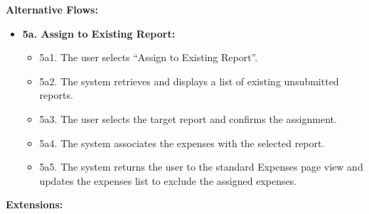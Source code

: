 \vspace{0.3cm}

\textbf{Alternative Flows:}

\begin{itemize} [label={}, leftmargin=0.75cm, noitemsep]
    \item \textbf{5a. Assign to Existing Report:}
    \begin{itemize} [label={}, leftmargin=0.75cm, noitemsep]
        \item 5a1. The user selects ``Assign to Existing Report''.
        \item 5a2. The system retrieves and displays a list of existing unsubmitted reports.
        \item 5a3. The user selects the target report and confirms the assignment.
        \item 5a4. The system associates the expenses with the selected report.
        \item 5a5. The system returns the user to the standard Expenses page view and updates the expenses list to exclude the assigned expenses.
    \end{itemize}
\end{itemize}

\vspace{0.3cm}

\textbf{Extensions:}

